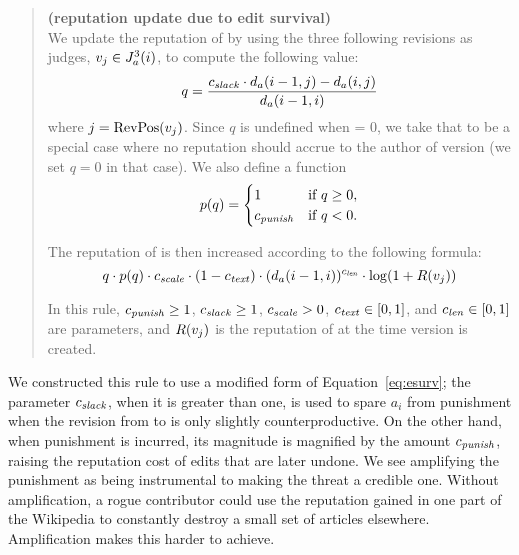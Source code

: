 \begin{quote}
  \begin{regola}
  \textbf{(reputation update due to edit survival)} \\
  \label{rule-edit}
    We update the reputation of  by
    using the three following revisions as judges,
    $v_j \in J_{a}^{3}(i)$, to compute the following value:
  \begin{equation*}
  q = \frac{\slack \cdot \dist{a}{i-1,j} - \dist{a}{i,j}}
                          {\dist{a}{i-1,i}}
  \label{eq-edit-long}
  \end{equation*}
  where $j = \mathrm{RevPos}(v_{j})$.
  Since $q$ is undefined when  = 0,
  we take that to be a special case where no reputation
  should accrue to the author of version 
  (\ie we set $q = 0$ in that case).
  We also define a  function
  \begin{equation*}
      p(q) =
          \begin{cases}
              1 & \text{if $q \ge 0$,} \\
              {c_{{\text{\textit{punish}}}}} & \text{if $q < 0$.} \\
          \end{cases}
  \end{equation*}

  The reputation of  is then increased
  according to the following formula:
  \begin{equation*}
  q \cdot p(q)
    \cdot {c_{{\text{\textit{scale}}}}} \cdot (1 - {c_{{\text{\textit{text}}}}}) \cdot
          (d_{a}(i-1,i))^{c_{{\text{\textit{len}}}}} \cdot \log(1 + R(v_{j}))
  \end{equation*}

    In this rule, ${c_{{\text{\textit{punish}}}}} \geq 1$, ${c_{{\text{\textit{slack}}}}} \geq 1$, ${c_{{\text{\textit{scale}}}}} > 0$,
    ${c_{{\text{\textit{text}}}}} \in [0,1]$, and ${c_{{\text{\textit{len}}}}} \in [0,1]$ are parameters,
    and $R(v_{j})$ is the reputation of 
    at the time version  is created.
  \end{regola}
\end{quote}

\noindent
We constructed this rule to use a modified form of
Equation~\ref{eq:esurv};
the parameter ${c_{{\text{\textit{slack}}}}}$, when it is greater than one, is used to spare $a_i$ from punishment when
the revision from  to  is only slightly
counterproductive.
On the other hand, when punishment is incurred, its magnitude is
magnified by the amount ${c_{{\text{\textit{punish}}}}}$, raising the reputation cost of
edits that are later undone.
We see amplifying the punishment as being instrumental
to making the threat a credible one.
Without amplification, a rogue contributor could use the reputation
gained in one part of the Wikipedia to constantly destroy a small set
of articles elsewhere.
Amplification makes this harder to achieve.

